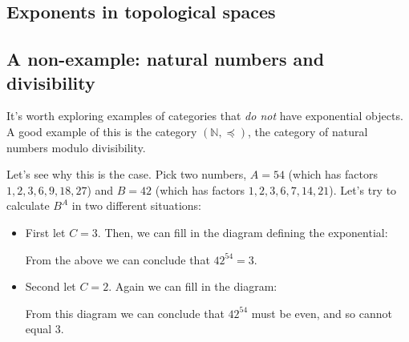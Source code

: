 \subsection{Exponents in topological spaces}


\subsection{A non-example: natural numbers and divisibility}
It's worth exploring examples of categories that \emph{do not}
have exponential objects. A good example of this 
is the category $(\mathbb{N}, \preceq)$, the category of 
natural numbers modulo divisibility.

Let's see why this is the case. Pick two numbers, $A = 54$
(which has factors $1,2,3,6,9,18,27$) 
and $B = 42$ (which has factors $1,2,3,6,7,14,21$). Let's try to calculate $B^A$ in two different 
situations:
\begin{itemize}
  \item First let $C = 3$. Then, we can fill in the diagram 
  defining the exponential:
  \begin{center}
  \end{center}
  From the above we can conclude that $42^{54} = 3$.

  \item Second let $C = 2$. Again we can fill in the diagram:
  \begin{center}
  \end{center}

  From this diagram we can conclude that $42^{54}$ must be even, and so cannot equal $3$. 

\end{itemize}

